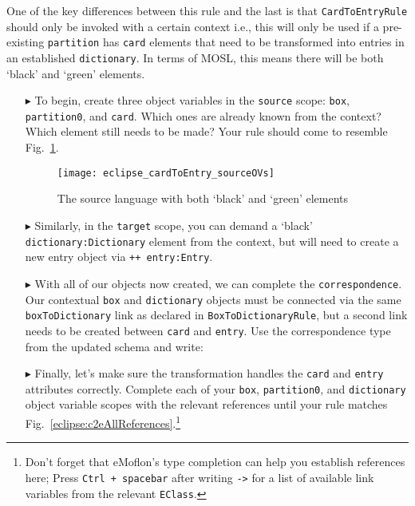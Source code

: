 One of the key differences between this rule and the last is that \texttt{Card\-To\-Ent\-ry\-Rule} should only be invoked with a certain context i.e., this will
only be used if a pre-existing \texttt{partition} has \texttt{card} elements that need to be transformed into entries in an established \texttt{dictionary}. In
terms of MOSL, this means there will be both `black' and `green' elements.

\begin{itemize}

\item[$\blacktriangleright$] To begin, create three object variables in the \texttt{source} scope: \texttt{box}, \texttt{partition0}, and \texttt{card}. Which
ones are already known from the context? Which element still needs to be made? Your rule should come to resemble Fig.~\ref{eclipse:c2eRuleSource}.

\begin{figure}[htbp]
\begin{center}
  \texttt{[image: eclipse\_cardToEntry\_sourceOVs]}
  \caption{The source language with both `black' and `green' elements}
  \label{eclipse:c2eRuleSource}
\end{center}
\end{figure}

\item[$\blacktriangleright$] Similarly, in the \texttt{target} scope, you can demand a `black' \texttt{dic\-tion\-ary:Dic\-tion\-ary} element from the context,
but will need to create a new entry object via \texttt{++ entry:Entry}. 

\vspace{0.5cm}

\item[$\blacktriangleright$] With all of our objects now created, we can complete the \texttt{cor\-res\-pon\-dence}. Our contextual \texttt{box} and
\texttt{dictionary} objects must be connected via the same \texttt{boxToDictionary} link as declared in \texttt{Box\-To\-Dict\-ion\-ary\-Rule}, but a second
link needs to be created between \texttt{card} and \texttt{entry}. Use the correspondence type from the updated schema and write: 

\vspace{0.5cm}

\item[$\blacktriangleright$] Finally, let's make sure the transformation handles the \texttt{card} and \texttt{entry} attributes correctly. Complete each of
your \texttt{box}, \texttt{partition0}, and \texttt{dictionary} object variable scopes with the relevant references until your rule matches
Fig.~\ref{eclipse:c2eAllReferences}.\footnote{Don't forget that eMoflon's type completion can help you establish references here; Press \texttt{Ctrl + spacebar}
after writing \texttt{->} for a list of available link variables from the
relevant \texttt{EClass}.}


\end{itemize}
